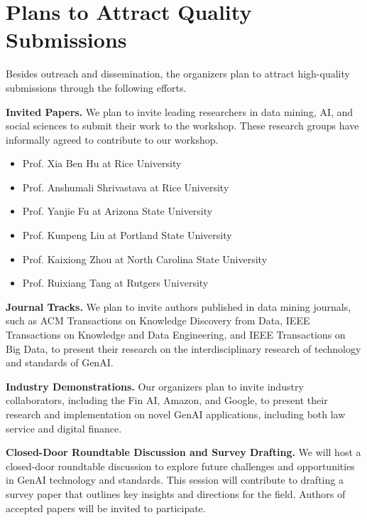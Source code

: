 \documentclass[conference]{IEEEtran}
\begin{document}
\section{Plans to Attract Quality Submissions}
Besides outreach and dissemination, the organizers plan to attract high-quality submissions through the following efforts.

\noindent \textbf{Invited Papers.} We plan to invite leading researchers in data mining, AI, and social sciences to submit their work to the workshop. These research groups have informally agreed to contribute to our workshop.
\begin{itemize}
    \item Prof. Xia Ben Hu at Rice University
    \item Prof. Anshumali Shrivastava at Rice University
    \item Prof. Yanjie Fu at Arizona State University
    \item Prof. Kunpeng Liu at Portland State University
    \item Prof. Kaixiong Zhou at North Carolina State University
    \item Prof. Ruixiang Tang at Rutgers University
\end{itemize}

\noindent \textbf{Journal Tracks.}  We plan to invite authors published in data mining journals, such as ACM Transactions on Knowledge Discovery from Data, IEEE Transactions on Knowledge and Data Engineering, and IEEE Transactions on Big Data, to present their research on the interdisciplinary research of technology and standards of GenAI.

\noindent \textbf{Industry Demonstrations.} Our organizers plan to invite industry collaborators, including the Fin AI, Amazon, and Google, to present their research and implementation on novel GenAI applications, including both law service and digital finance.

\noindent \textbf{Closed-Door Roundtable Discussion and Survey Drafting.} We will host a closed-door roundtable discussion to explore future challenges and opportunities in GenAI technology and standards. This session will contribute to drafting a survey paper that outlines key insights and directions for the field. Authors of accepted papers will be invited to participate.
\end{document}
